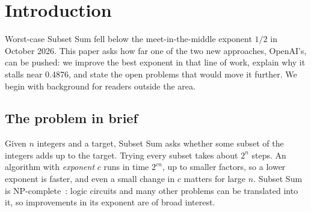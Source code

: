 \documentclass[11pt]{article}
\theoremstyle{plain}
\begin{document}
\section{Introduction}

Worst-case Subset Sum fell below the meet-in-the-middle exponent $1/2$ in October 2026. This paper asks how far one of the two new approaches, OpenAI's, can be pushed: we improve the best exponent in that line of work, explain why it stalls near 0.4876, and state the open problems that would move it further. We begin with background for readers outside the area.

\subsection*{The problem in brief}
Given $n$ integers and a target, Subset Sum asks whether some subset of the integers adds up to the target. Trying every subset takes about $2^n$ steps. An algorithm with \emph{exponent} $c$ runs in time $2^{cn}$, up to smaller factors, so a lower exponent is faster, and even a small change in $c$ matters for large $n$. Subset Sum is NP-complete~\cite{karp}: logic circuits and many other problems can be translated into it, so improvements in its exponent are of broad interest.
\end{document}
